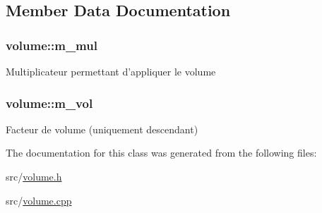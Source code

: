 \subsection{Member Data Documentation}
\hypertarget{classvolume_a882a7cff6324a567d4295239811be846}{
\subsubsection[{m\-\_\-mul}]{ volume\-::m\-\_\-mul\hspace{0.3cm}{\ttfamily [private]}}}\label{classvolume_a882a7cff6324a567d4295239811be846}
Multiplicateur permettant d'appliquer le volume \hypertarget{classvolume_af992e96f1c1aedd23a4a9ef5f13eb726}{
\subsubsection[{m\-\_\-vol}]{ volume\-::m\-\_\-vol\hspace{0.3cm}{\ttfamily [private]}}}\label{classvolume_af992e96f1c1aedd23a4a9ef5f13eb726}
Facteur de volume (uniquement descendant) 

The documentation for this class was generated from the following files\-:\begin{DoxyCompactItemize}
\item 
src/\hyperlink{volume_8h}{volume.\-h}\item 
src/\hyperlink{volume_8cpp}{volume.\-cpp}\end{DoxyCompactItemize}
